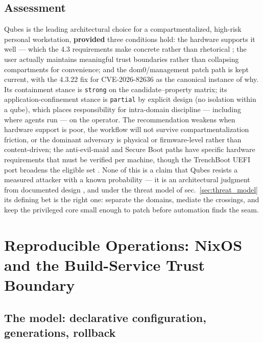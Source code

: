 \documentclass[
  english,
  9pt,
]{extarticle}
\begin{document}
\subsection{Assessment}\label{assessment}

Qubes is the leading architectural choice for a compartmentalized,
high-risk personal workstation, \textbf{provided} three conditions hold:
the hardware supports it well --- which the 4.3 requirements make
concrete rather than rhetorical \citep{qubes_43_requirements}; the user
actually maintains meaningful trust boundaries rather than collapsing
compartments for convenience; and the dom0/management patch path is kept
current, with the 4.3.22 fix for CVE-2026-82636 as the canonical
instance of why. Its containment stance is \texttt{strong} on the
candidate--property matrix; its application-confinement stance is
\texttt{partial} by explicit design (no isolation within a qube), which
places responsibility for intra-domain discipline --- including where
agents run --- on the operator. The recommendation weakens when hardware
support is poor, the workflow will not survive compartmentalization
friction, or the dominant adversary is physical or firmware-level rather
than content-driven; the anti-evil-maid and Secure Boot paths have
specific hardware requirements that must be verified per machine, though
the TrenchBoot UEFI port broadens the eligible set
\citep{qubes_anti_evil_maid, qubes_issue_4371, trenchboot_aem_uefi}.
None of this is a claim that Qubes resists a measured attacker with a
known probability --- it is an architectural judgment from documented
design \citep{qubes_architecture}, and under the threat model of
sec.~\ref{sec:threat_model} its defining bet is the right one: separate
the domains, mediate the crossings, and keep the privileged core small
enough to patch before automation finds the seam.

\newpage

\section{Reproducible Operations: NixOS and the Build-Service Trust
Boundary}\label{sec:nixos}

\subsection{The model: declarative configuration, generations,
rollback}\label{the-model-declarative-configuration-generations-rollback}
\end{document}
